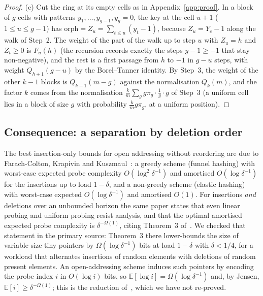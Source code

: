 \documentclass[11pt,a4paper]{article}
\theoremstyle{definition}
\theoremstyle{remark}
\newcommand{\Prob}{\mathbb{P}}
\newcommand{\E}{\mathbb{E}}
\begin{document}
\begin{proof}
(c) Cut the ring at its empty cells as in Appendix~\ref{app:proof}. In a block of $g$ cells with patterns $y_1,\dots,y_{g-1},y_g=0$, the key at the cell $u+1$ ($1\le u\le g-1$) has $\mathrm{orph}=Z_u=\sum_{t\le u}(y_t-1)$, because $Z_u=Y_{c}-1$ along the walk of Step~2. The weight of the part of the walk up to step $u$ with $Z_u=h$ and $Z_t\ge0$ is $F_u(h)$ (the recursion records exactly the steps $y-1\ge-1$ that stay non-negative), and the rest is a first passage from $h$ to $-1$ in $g-u$ steps, with weight $Q_{h+1}(g-u)$ by the Borel--Tanner identity. By Step~3, the weight of the other $k-1$ blocks is $Q_{k-1}(m-g)$ against the normalisation $Q_k(m)$, and the factor $k$ comes from the normalisation $\frac km\sum_gg\pi_g\cdot\frac1{g}\cdot g$ of Step~3 (a uniform cell lies in a block of size $g$ with probability $\frac km g\pi_g$, at a uniform position).
\end{proof}

\begin{table}[t]
\centering\small
\caption{Limit law of the number of orphans of a uniformly random live key, $\Prob(\mathrm{orph}=j)$ for $j=0,\dots,4$, and its mean $\alpha/(2(1-\alpha))$. The first column is the fraction of keys that nothing depends on.}\label{tab:orphan}

\end{table}

\subsection{Consequence: a separation by deletion order}

The best insertion-only bounds for open addressing without reordering are due to Farach-Colton, Krapivin and Kuszmaul~\cite{fkk2024}: a greedy scheme (funnel hashing) with worst-case expected probe complexity $O(\log^2\delta^{-1})$ and amortised $O(\log\delta^{-1})$ for the insertions up to load $1-\delta$, and a non-greedy scheme (elastic hashing) with worst-case expected $O(\log\delta^{-1})$ and amortised $O(1)$. For insertions \emph{and} deletions over an unbounded horizon the same paper states that even linear probing and uniform probing resist analysis, and that the optimal amortised expected probe complexity is $\delta^{-\Omega(1)}$, citing Theorem~3 of~\cite{tinypointers2025}. We checked that statement in the primary source: Theorem~3 there lower-bounds the size of variable-size tiny pointers by $\Omega(\log\delta^{-1})$ bits at load $1-\delta$ with $\delta<1/4$, for a workload that alternates insertions of random elements with deletions of random present elements. An open-addressing scheme induces such pointers by encoding the probe index $i$ in $O(\log i)$ bits, so $\E[\log i]=\Omega(\log\delta^{-1})$ and, by Jensen, $\E[i]\ge\delta^{-\Omega(1)}$; this is the reduction of~\cite{fkk2024}, which we have not re-proved.
\end{document}
